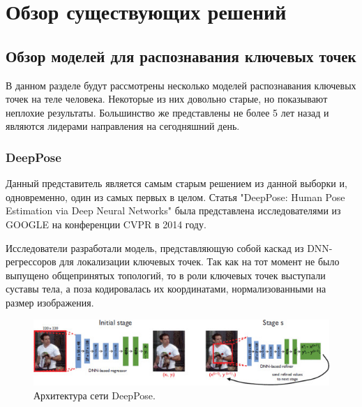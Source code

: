 \section{Обзор существующих решений}
\label{sec:Chapter4} 



\subsection{Обзор моделей для распознавания ключевых точек}
\label{sec:Chapter4_PE}

В данном разделе будут рассмотрены несколько моделей распознавания ключевых точек на теле человека. Некоторые из них довольно старые, но показывают неплохие результаты. Большинство же представлены не более 5 лет назад и являются лидерами направления на сегодняшний день.

\subsubsection*{DeepPose}

Данный представитель является самым старым решением из данной выборки и, одновременно, один из самых первых в целом. Статья "DeepPose: Human Pose Estimation via Deep Neural Networks"   \cite{DeepPose} была представлена исследователями из GOOGLE на конференции CVPR в 2014 году.

Исследователи разработали модель, представляющую собой каскад из DNN-регрессоров для локализации ключевых точек. Так как на тот момент не было выпущено общепринятых топологий, то в роли ключевых точек выступали суставы тела, а поза кодировалась их координатами, нормализованными на размер изображения.

\begin{figure}[h]
	\centering
	\includegraphics[width=\textwidth]{./images/DeepPose}
	\caption{Архитектура сети DeepPose. \cite{DeepPose}}
	\label{fig:dp_architecture}
\end{figure}

